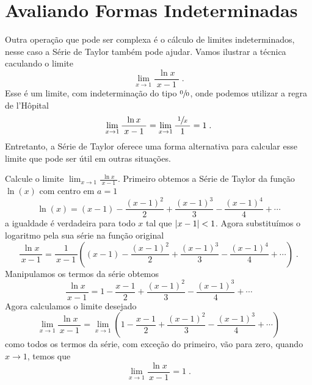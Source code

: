 \section{Avaliando Formas Indeterminadas}

Outra operação que pode ser complexa é o cálculo de limites indeterminados,
nesse caso a Série de Taylor também pode ajudar.
Vamos ilustrar a técnica caculando o limite
\[
\lim_{x\to 1} \frac{\ln x}{\;x-1\;} \;.
\]
Esse é um limite, com indeterminação do tipo $\sfrac{0}{0}$,
onde podemos utilizar a regra de l'Hôpital
\[
\lim_{x\to 1} \frac{\ln x}{\;x-1\;}
= \lim_{x\to 1} \frac{\;\sfrac{1}{x}\;}{1}
= 1 \;.
\]
Entretanto, a Série de Taylor oferece uma forma alternativa
para calcular esse limite que pode ser útil em outras situações.

\begin{example}
  Calcule o limite
  \(
  \lim_{x\to 1} \frac{\ln x}{\;x-1\;}
  \).
  \solution
  Primeiro obtemos a Série de Taylor da função $\ln(x)$ com centro em $a=1$
  \[
  \ln(x) = (x-1) - \frac{(x-1)^2}{2}
  + \frac{(x-1)^3}{3}
  - \frac{(x-1)^4}{4}
  + \cdots
  \]
  a igualdade é verdadeira para todo $x$ tal que $\abs{x-1} < 1$.
  Agora substituímos o logaritmo pela sua série na função original
  \[
  \frac{\ln x}{\,x-1\,}
  = \frac{1}{\,x-1\,}
  \left( (x-1)
  - \frac{(x-1)^2}{2}
  + \frac{(x-1)^3}{3}
  - \frac{(x-1)^4}{4}
  + \cdots
  \right) \;.
  \]
  Manipulamos os termos da série obtemos
  \[
  \frac{\ln x}{\,x-1\,}
  = 1 - \frac{x-1}{2} + \frac{(x-1)^2}{3} - \frac{(x-1)^3}{4} + \cdots
  \]
  Agora calculamos o limite desejado
  \[
  \lim_{x\to 1} \frac{\ln x}{\,x-1\,}
  = \lim_{x\to 1} \left( 1
  - \frac{x-1}{2}
  + \frac{(x-1)^2}{3}
  - \frac{(x-1)^3}{4}
  + \cdots
  \right)
  \]
  como todos os termos da série, com exceção do primeiro, vão para zero,
  quando $x\to 1$, temos que
  \[
  \lim_{x\to 1} \frac{\ln x}{\,x-1\,} = 1 \;.
  \]
\end{example}

